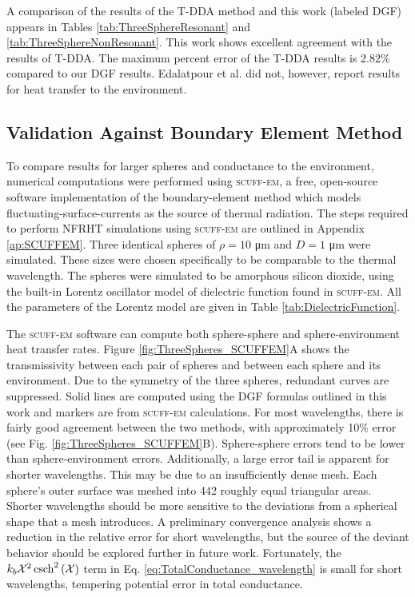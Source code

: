A comparison of the results of the T-DDA method and this work (labeled DGF) appears in Tables \ref{tab:ThreeSphereResonant} and \ref{tab:ThreeSphereNonResonant}. This work shows excellent agreement with the results of T-DDA. The maximum percent error of the T-DDA results is 2.82\% compared to our DGF results. Edalatpour et al. did not, however, report results for heat transfer to the environment.


\subsection{Validation Against Boundary Element Method}
%
To compare results for larger spheres and conductance to the environment, numerical computations were performed using \textsc{scuff-em}, a free, open-source software implementation of the boundary-element method \cite{scuffem, Reid2015} which models fluctuating-surface-currents as the source of thermal radiation. The steps required to perform NFRHT simulations using \textsc{scuff-em} are outlined in Appendix \ref{ap:SCUFFEM}. Three identical spheres of $\rho=10$ \si{\micro\meter} and $D = 1$ \si{\micro\meter} were simulated. These sizes were chosen specifically to be comparable to the thermal wavelength. The spheres were simulated to be amorphous silicon dioxide, using the built-in Lorentz oscillator model of dielectric function found in \textsc{scuff-em}. All the parameters of the Lorentz model are given in Table \ref{tab:DielectricFunction}.

The \textsc{scuff-em} software can compute both sphere-sphere and sphere-environment heat transfer rates. Figure \ref{fig:ThreeSpheres_SCUFFEM}A shows the transmissivity between each pair of spheres and between each sphere and its environment. Due to the symmetry of the three spheres, redundant curves are suppressed. Solid lines are computed using the DGF formulas outlined in this work and markers are from \textsc{scuff-em} calculations. For most wavelengths, there is fairly good agreement between the two methods, with approximately 10\% error (see Fig. \ref{fig:ThreeSpheres_SCUFFEM}B). Sphere-sphere errors tend to be lower than sphere-environment errors. Additionally, a large error tail is apparent for shorter wavelengths. This may be due to an insufficiently dense mesh. Each sphere's outer surface was meshed into 442 roughly equal triangular areas. Shorter wavelengths should be more sensitive to the deviations from a spherical shape that a mesh introduces. A preliminary convergence analysis shows a reduction in the relative error for short wavelengths, but the source of the deviant behavior should be explored further in future work. Fortunately, the $k_{b} \mathcal{X}^{2} \operatorname{csch}^{2}{\left( \mathcal{X} \right)}$ term in Eq. \ref{eq:TotalConductance_wavelength} is small for short wavelengths, tempering potential error in total conductance.


